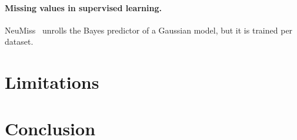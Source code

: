 \documentclass{article}
\begin{document}
\paragraph{Missing values in supervised learning.} NeuMiss~\citep{lemorvan2020neumiss} unrolls the Bayes predictor of a
Gaussian model, but it is trained per dataset.

\section{Limitations}
\label{sec:limits}


\section{Conclusion}





\clearpage
\appendix

\end{document}
